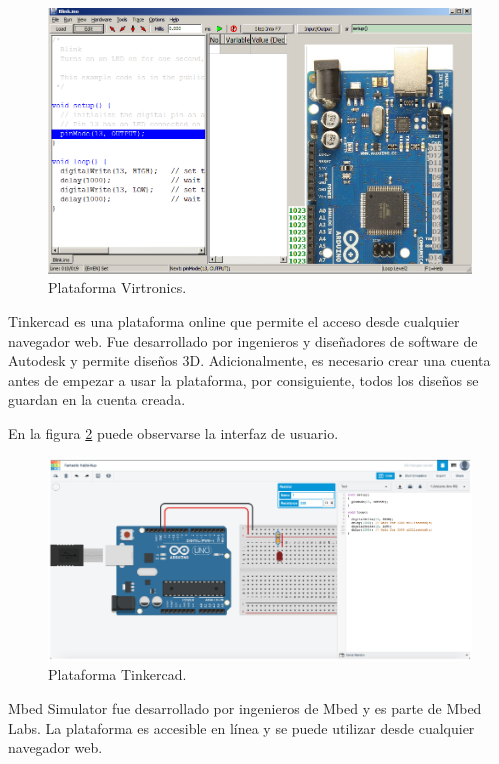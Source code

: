 \begin{figure}[ht]
	\centering
	\includegraphics[scale=.35]{./Figures/Virtronics.png}
	\caption{Plataforma Virtronics.}
	\label{fig:Virtronics}
\end{figure}


Tinkercad \citep{Tinkercad} es una plataforma online que permite el acceso desde cualquier navegador web. Fue desarrollado por ingenieros y diseñadores de software de Autodesk \citep{Autodesk} y permite diseños 3D. Adicionalmente, es necesario crear una cuenta  antes de empezar a usar la plataforma, por consiguiente, todos los diseños se guardan en la cuenta creada.

En la figura \ref{fig:Tinkercad} puede observarse la interfaz de usuario.

\begin{figure}[ht]
	\centering
	\includegraphics[scale=.42]{./Figures/Tinkercad.png}
	\caption{Plataforma Tinkercad.}
	\label{fig:Tinkercad}
\end{figure}


Mbed Simulator \citep{ArmMbedSim} fue desarrollado por ingenieros de Mbed \citep{ArmMbed} y es parte de Mbed Labs. La plataforma es accesible en línea y se puede utilizar desde cualquier navegador web.

